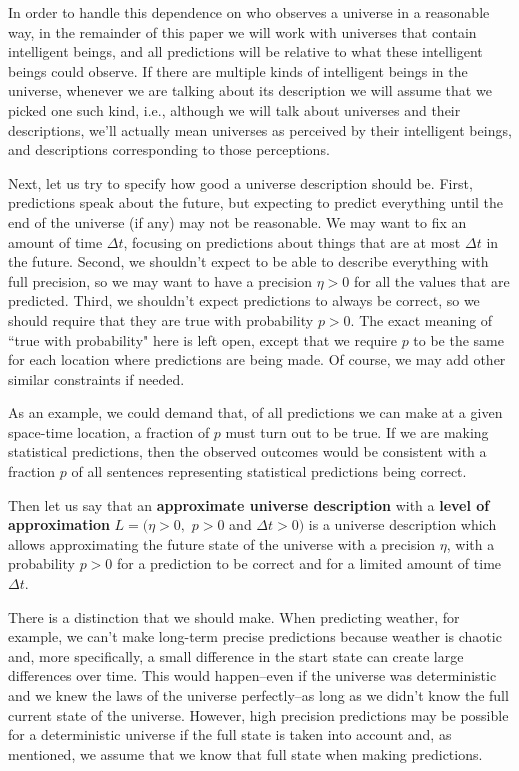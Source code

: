 \documentclass[a4paper
,draft
]{article}
\newcommand{\definitie}[1]{\textbf{#1}}
\newcommand{\ghilimele}[1]{``#1"}
\begin{document}
In order to handle this dependence on who observes a universe
in a reasonable way, in the remainder of this paper we will work with universes
that contain intelligent beings,
and all predictions will be relative to what these intelligent beings
could observe.
If there are multiple kinds of intelligent beings in the
universe, whenever we are talking about its description
we will assume that we picked one such kind,
i.e., although we
will talk about universes and their descriptions, we'll actually mean
universes as perceived by their intelligent beings, and descriptions corresponding to those perceptions.

Next, let us try to specify how good a universe description
should be. First, predictions speak about the future, but expecting to
predict everything until the end of the universe (if any) may not be
reasonable. We may want to fix an amount of time $\Delta t$,
focusing on predictions about things that are at most
$\Delta t$ in the future. Second, we shouldn't expect to
be able to describe everything with full precision, so we may want to
have a precision $\eta>0$ for all the values that are predicted.
Third, we shouldn't expect predictions to always be correct, so
we should require that they are true with probability $p>0$.
The exact meaning of \ghilimele{true with probability} here is left open,
except that we require $p$ to be the same for each location where
predictions are being made.
Of course, we may add other similar constraints if needed.

As an example, we could demand that, of all predictions we can make
at a given space-time location, a fraction of $p$ must turn out to be true.
If we are making
statistical predictions, then the observed outcomes would be consistent
with a fraction $p$ of all sentences representing statistical predictions
being correct.

Then let us say that an \definitie{approximate universe description} with a
\definitie{level of approximation} $L=(\eta>0,$ $p>0$ and $\Delta t>0)$
is a universe description which allows approximating the future
state of the universe with a precision $\eta$, with a probability
$p>0$ for a prediction to be correct
and for a limited amount of time $\Delta t$.

There is a distinction that we should make.
When predicting weather, for example, we can't make long-term precise predictions
because weather is chaotic and, more specifically, a small difference
in the start state can create large differences over time.
This would happen–even if the universe was deterministic
and we knew the laws of the universe perfectly–as long as we didn't know
the full current state of the universe.
However, high precision predictions may be possible for a deterministic
universe if the full state
is taken into account and, as mentioned, we assume that we know that full
state when making predictions.
\end{document}
